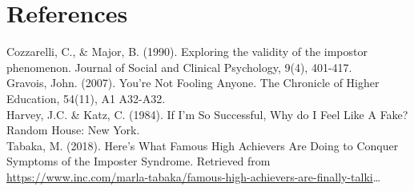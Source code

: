 \documentclass[]{article}
\begin{document}
\hypertarget{references}{%
\section{References}\label{references}}

Cozzarelli, C., \& Major, B. (1990). Exploring the validity of the
impostor phenomenon. Journal of Social and Clinical Psychology, 9(4),
401-417.\\
Gravois, John. (2007). You're Not Fooling Anyone. The Chronicle of
Higher Education, 54(11), A1 A32-A32.\\
Harvey, J.C. \& Katz, C. (1984). If I'm So Successful, Why do I Feel
Like A Fake? Random House: New York.\\
Tabaka, M. (2018). Here's What Famous High Achievers Are Doing to
Conquer Symptoms of the Imposter Syndrome. Retrieved from
\url{https://www.inc.com/marla-tabaka/famous-high-achievers-are-finally-talki}\ldots{}
\end{document}
